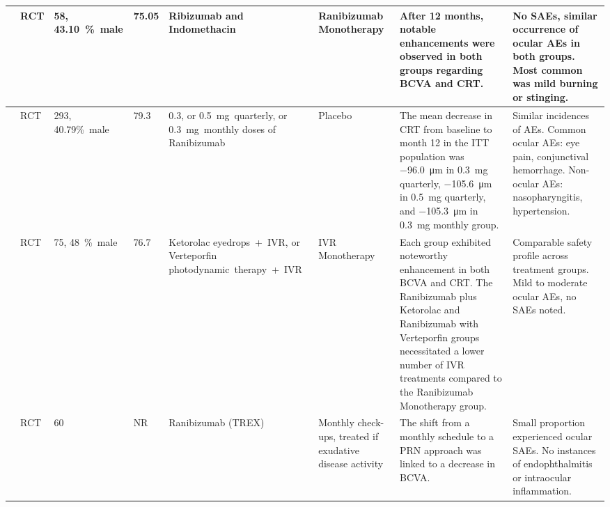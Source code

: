\begin{landscape}
\begin{longtable}{|p{1.5cm}|l|p{1.5cm}|p{1.3cm}|p{2.75cm}|p{2.5cm}|p{7.5cm}|p{4.75cm}|}
        \citet{russo2018} & RCT & \num{58}, \qty{43.10}{\percent}~male & 75.05 & Ribizumab and \mbox{Indomethacin} & Ranibizumab Monotherapy & After 12 months, notable enhancements were observed in both groups regarding BCVA and CRT. & No SAEs, similar occurrence of ocular AEs in both groups. Most common was mild burning or stinging.\\ \hline
        \citet{schmidt2011} & RCT & \num{293}, 40.79\%~male & 79.3 & 0.3, or \qty{0.5}{\milli\gram}~quarterly, or \qty{0.3}{\milli\gram}~monthly doses of Ranibizumab & Placebo & The mean decrease in CRT from baseline to month 12 in the ITT population was \qty{-96.0}{\micro\metre} in \qty{0.3}{\milli\gram} quarterly, \qty{-105.6}{\micro\metre} in 0.5~mg quarterly, and \qty{-105.3}{\micro\metre} in \qty{0.3}{\milli\gram} monthly group. & Similar incidences of AEs. \mbox{Common} ocular AEs: eye pain, \mbox{conjunctival} hemorrhage. Non-ocular AEs: \mbox{nasopharyngitis}, hyper\-tension.\\ \hline
        \citet{semeraro2015} & RCT & \num{75}, \qty{48}{\percent}~male & 76.7 & Ketorolac eyedrops~+~IVR, or Verteporfin photodynamic~therapy~+~IVR & IVR Monotherapy & Each group exhibited noteworthy enhancement in both BCVA and CRT. The Ranibizumab plus Ketorolac and Ranibizumab with Verteporfin groups necessitated a lower number of IVR treatments compared to the Ranibizumab Monotherapy group. & Comparable safety profile across treatment groups. Mild to moderate ocular AEs, no SAEs noted.\\ \hline
        \citet{wykoff2018} & RCT & \num{60} & NR & Ranibizumab (TREX) & Monthly check-ups, treated if exudative disease activity & The shift from a monthly schedule to a PRN approach was linked to a decrease in BCVA. & Small proportion experienced ocular SAEs. No instances of endoph\-thalmitis or intra\-ocular inflammation.\\ \hline
        \end{longtable}
        \twocolumn
\end{landscape}